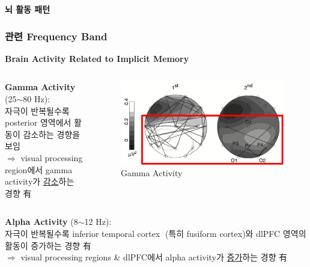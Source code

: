 \documentclass{beamer}
\begin{document}
\begin{frame}{\textbf{뇌 활동 패턴}}
\begin{itemize}
  \end{itemize}
\end{frame}

\subsubsection{관련 Frequency Band}
\begin{frame}{\textbf{Brain Activity Related to Implicit Memory}}
    \begin{columns}
    \begin{column}{0.62\textwidth}
      \large
      \textbf{Gamma Activity} (25$\sim$80 Hz):\\
      자극이 반복될수록 posterior 영역에서 활동이 감소하는 경향을 보임\\
      {\color{blue} $\Rightarrow$ visual processing region에서 gamma activity가 \underline{감소}하는 경향 有}
    \end{column}
    \hfill
    \begin{column}{0.38\textwidth}
      \centering
      \begin{figure}
        \centering
        \includegraphics[width=\textwidth]{image/gamma_im}
        \caption{Gamma Activity}
      \end{figure}
    \end{column}
  \end{columns}
  \begin{columns}
    \begin{column}{0.62\textwidth}
      \large
      \textbf{Alpha Activity} (8$\sim$12 Hz):\\
      자극이 반복될수록 inferior temporal cortex (특히 fusiform cortex)와 dlPFC 영역의 활동이 증가하는 경향 有\\
      {\color{blue} $\Rightarrow$ visual processing regions \& dlPFC에서 alpha activity가 \underline{증가}하는 경향 有}
    \end{column}

\end{columns}
\end{frame}
\end{document}
